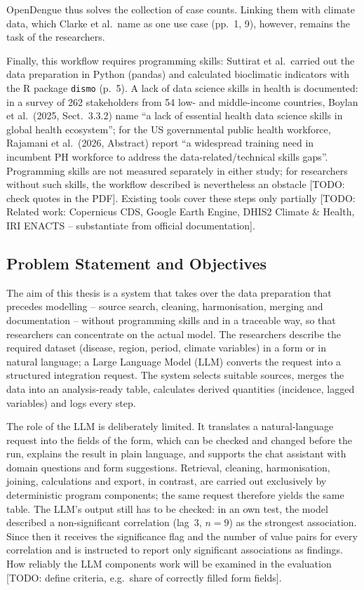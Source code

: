 \documentclass[11pt,a4paper]{article}
\newcommand{\todo}[1]{\textcolor{red!70!black}{[TODO: #1]}}
\begin{document}
OpenDengue thus solves the collection of case counts. Linking them with climate
data, which Clarke et al.\ name as one use case (pp.~1, 9), however, remains the
task of the researchers.

Finally, this workflow requires programming skills: Suttirat et al.\ carried
out the data preparation in Python (pandas) and calculated bioclimatic indicators
with the R package \texttt{dismo} (p.~5). A lack of data science skills in
health is documented: in a survey of 262 stakeholders from 54 low- and
middle-income countries, Boylan et al.\ (2025, Sect.~3.3.2) name \enquote{a lack
of essential health data science skills in global health ecosystem}; for the US
governmental public health workforce, Rajamani et al.\ (2026, Abstract) report
\enquote{a widespread training need in incumbent PH workforce to address the
data-related/technical skills gaps}. Programming skills are not measured
separately in either study; for researchers without such skills, the workflow
described is nevertheless an obstacle \todo{check quotes in the PDF}.
Existing tools cover these steps only partially
\todo{Related work: Copernicus CDS, Google Earth Engine, DHIS2 Climate \& Health, IRI ENACTS -- substantiate from official documentation}.

\subsection{Problem Statement and Objectives}

The aim of this thesis is a system that takes over the data preparation that
precedes modelling -- source search, cleaning, harmonisation, merging and
documentation -- without programming skills and in a traceable way, so that
researchers can concentrate on the actual model. The researchers describe the
required dataset (disease, region, period, climate variables) in a form or in
natural language; a Large Language Model (LLM) converts the request into a
structured integration request. The system selects suitable sources, merges the
data into an analysis-ready table, calculates derived quantities (incidence,
lagged variables) and logs every step.

The role of the LLM is deliberately limited. It translates a natural-language
request into the fields of the form, which can be checked and changed before the
run, explains the result in plain language, and supports the chat assistant with
domain questions and form suggestions. Retrieval, cleaning, harmonisation, joining,
calculations and export, in contrast, are carried out exclusively by deterministic
program components; the same request therefore yields the same table. The LLM's
output still has to be checked: in an own test, the model described a
non-significant correlation (lag~3, $n = 9$) as the strongest association. Since
then it receives the significance flag and the number of value pairs for every
correlation and is instructed to report only significant associations as findings. How reliably
the LLM components work will be examined in the evaluation
\todo{define criteria, e.g.\ share of correctly filled form fields}.
\end{document}
